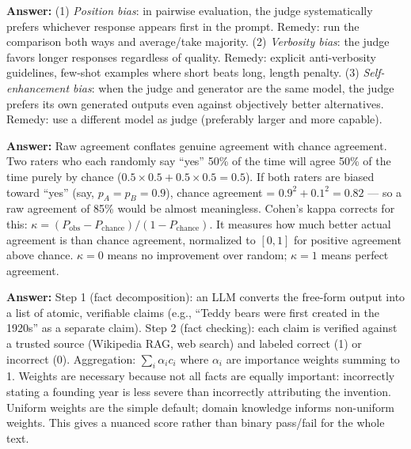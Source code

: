 \documentclass[11pt, a4paper]{article}
\begin{document}
\begin{notebox}
\textbf{Answer:} (1) \emph{Position bias}: in pairwise evaluation, the judge systematically prefers whichever response appears first in the prompt. Remedy: run the comparison both ways and average/take majority. (2) \emph{Verbosity bias}: the judge favors longer responses regardless of quality. Remedy: explicit anti-verbosity guidelines, few-shot examples where short beats long, length penalty. (3) \emph{Self-enhancement bias}: when the judge and generator are the same model, the judge prefers its own generated outputs even against objectively better alternatives. Remedy: use a different model as judge (preferably larger and more capable).
\end{notebox}

\begin{notebox}
\textbf{Answer:} Raw agreement conflates genuine agreement with chance agreement. Two raters who each randomly say ``yes'' 50\% of the time will agree 50\% of the time purely by chance ($0.5 \times 0.5 + 0.5 \times 0.5 = 0.5$). If both raters are biased toward ``yes'' (say, $p_A = p_B = 0.9$), chance agreement = $0.9^2 + 0.1^2 = 0.82$ --- so a raw agreement of 85\% would be almost meaningless. Cohen's kappa corrects for this: $\kappa = (P_\text{obs} - P_\text{chance})/(1 - P_\text{chance})$. It measures how much better actual agreement is than chance agreement, normalized to $[0, 1]$ for positive agreement above chance. $\kappa = 0$ means no improvement over random; $\kappa = 1$ means perfect agreement.
\end{notebox}

\begin{notebox}
\textbf{Answer:} Step 1 (fact decomposition): an LLM converts the free-form output into a list of atomic, verifiable claims (e.g., ``Teddy bears were first created in the 1920s'' as a separate claim). Step 2 (fact checking): each claim is verified against a trusted source (Wikipedia RAG, web search) and labeled correct (1) or incorrect (0). Aggregation: $\sum_i \alpha_i c_i$ where $\alpha_i$ are importance weights summing to 1. Weights are necessary because not all facts are equally important: incorrectly stating a founding year is less severe than incorrectly attributing the invention. Uniform weights are the simple default; domain knowledge informs non-uniform weights. This gives a nuanced score rather than binary pass/fail for the whole text.
\end{notebox}
\end{document}

